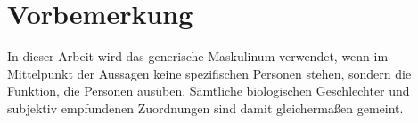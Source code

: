 \chapter*{Vorbemerkung}

In dieser Arbeit wird das generische Maskulinum verwendet, wenn im Mittelpunkt der Aussagen keine spezifischen Personen stehen, sondern die Funktion, die Personen ausüben. Sämtliche biologischen Geschlechter und subjektiv empfundenen Zuordnungen sind damit gleichermaßen gemeint.

